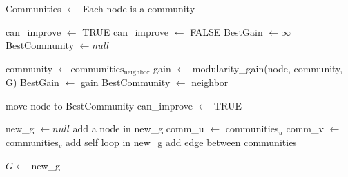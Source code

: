 \documentclass{article}
\begin{document}
\begin{algorithm}
\caption{Community}
\begin{algorithmic}

\State Communities $\gets$ Each node is a community  

    \State can\_improve $\gets$ TRUE
        \State can\_improve $\gets$ FALSE
            \State BestGain $\gets \infty$
            \State BestCommunity $\gets null$
            \Statex
                
                \State community $\gets \text{communities}_\text{neighbor}$
                \State gain $\gets$ modularity\_gain(node, community, G)
                    \State BestGain $\gets$ gain
                    \State BestCommunity $\gets$ neighbor
                \EndIf
            \EndFor
            \Statex

                \State move node to BestCommunity
                \State can\_improve $\gets$ TRUE
            \EndIf
        \EndFor
    \EndWhile
    \Statex

    \State new\_g $\gets null $
        \State add a node in new\_g
    \EndFor
        \State comm\_u $\gets$ communities$_u$
        \State comm\_v $\gets$ communities$_v$
            \State add self loop in new\_g
        \Else
            \State add edge between communities
        \EndIf
    \EndFor
    \Statex

    \State $G \gets $ new\_g
\EndFor


\end{algorithmic}
\end{algorithm}





\newpage
\end{document}
